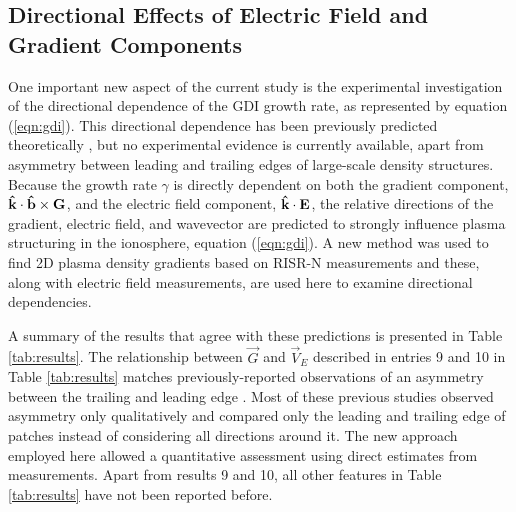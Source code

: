 \subsection{Directional Effects of Electric Field and Gradient Components}
\label{sec:discussion2}
One important new aspect of the current study is the experimental investigation of the directional dependence of the GDI growth rate, as represented by equation  (\ref{eqn:gdi}). This directional dependence has been previously predicted theoretically \citep{Keskinen1982a,Makarevich2014c,Lamarche2016}, but no experimental evidence is currently available, apart from asymmetry between leading and trailing edges of large-scale density structures. Because the growth rate \(\gamma\) is directly dependent on both the gradient component, \(\mathbf{\hat{k}}\cdot\mathbf{\hat{b}}\times\mathbf{G}\), and the electric field component, \(\mathbf{\hat{k}}\cdot\mathbf{E}\), the relative directions of the gradient, electric field, and wavevector are predicted to strongly influence plasma structuring in the ionosphere, equation (\ref{eqn:gdi}).  A new method was used to find 2D plasma density gradients based on RISR-N measurements and these, along with electric field measurements, are used here to examine directional dependencies.


A summary of the results that agree with these predictions is presented in Table \ref{tab:results}.  The relationship between \(\vec{G}\) and \(\vec{V}_E\) described in entries 9 and 10 in Table \ref{tab:results} matches previously-reported observations of an asymmetry between the trailing and leading edge \citep[][]{Weber1984,Milan2002b,Koustov2012,Moe2012}. Most of these previous studies observed asymmetry only qualitatively and compared only the leading and trailing edge of patches instead of considering all directions around it.  The new approach employed here allowed a quantitative assessment using direct estimates from measurements. Apart from results 9 and 10, all other features in Table  \ref{tab:results} have not been reported before.


